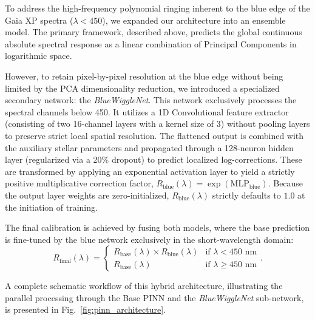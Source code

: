 \documentclass{aa}
\begin{document}
\begin{enumerate}[itemsep=0.25cm]
    
\end{enumerate}

To address the high-frequency polynomial ringing inherent to the blue edge of the Gaia XP spectra ($\lambda < 450$), we expanded our architecture into an ensemble model. The primary framework, described above, predicts the global continuous absolute spectral response as a linear combination of Principal Components in logarithmic space. 

However, to retain pixel-by-pixel resolution at the blue edge without being limited by the PCA dimensionality reduction, we introduced a specialized secondary network: the \textit{BlueWiggleNet}. This network exclusively processes the spectral channels below 450. It utilizes a 1D Convolutional feature extractor (consisting of two 16-channel layers with a kernel size of 3) without pooling layers to preserve strict local spatial resolution. The flattened output is combined with the auxiliary stellar parameters and propagated through a 128-neuron hidden layer (regularized via a 20\% dropout) to predict localized log-corrections. These are transformed by applying an exponential activation layer to yield a strictly positive multiplicative correction factor, $R_{\text{blue}}(\lambda) = \exp(\text{MLP}_{\text{blue}})$. Because the output layer weights are zero-initialized, $R_{\text{blue}}(\lambda)$ strictly defaults to $1.0$ at the initiation of training.

The final calibration is achieved by fusing both models, where the base prediction is fine-tuned by the blue network exclusively in the short-wavelength domain:
\begin{equation}
    R_{\text{final}}(\lambda) = 
    \begin{cases} 
        R_{\text{base}}(\lambda) \times R_{\text{blue}}(\lambda) & \text{if } \lambda < 450 \text{ nm} \\ 
        R_{\text{base}}(\lambda) & \text{if } \lambda \ge 450 \text{ nm} 
    \end{cases}.
\end{equation}

A complete schematic workflow of this hybrid architecture, illustrating the parallel processing through the Base PINN and the \textit{BlueWiggleNet} sub-network, is presented in Fig.~\ref{fig:pinn_architecture}.
\end{document}

